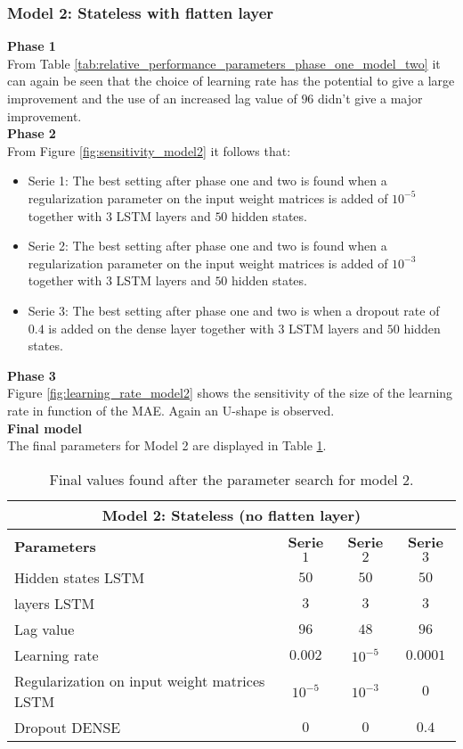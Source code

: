 \subsubsection{Model 2: Stateless with flatten layer}

\textbf{Phase 1}\\
From Table \ref{tab:relative_performance_parameters_phase_one_model_two} it can again be seen that the choice of learning rate has the potential to give a large improvement and the use of an increased lag value of $ 96 $ didn't give a major improvement.\\ 

\textbf{Phase 2}\\
From Figure \ref{fig:sensitivity_model2} it follows that:
\begin{itemize}
	\item Serie 1: The best setting after phase one and two is found when a regularization parameter on the input weight matrices is added of $ 10^{-5} $ together with $ 3 $ LSTM layers and $ 50 $ hidden states. 
	\item Serie 2: The best setting after phase one and two is found when a regularization parameter on the input weight matrices is added of $ 10^{-3} $ together with $ 3 $ LSTM layers and $ 50 $ hidden states.
	\item Serie 3: The best setting after phase one and two is when a dropout rate of $ 0.4 $ is added on the dense layer together with $ 3 $ LSTM layers and $ 50 $ hidden states.
\end{itemize}

\textbf{Phase 3}\\
Figure \ref{fig:learning_rate_model2} shows the sensitivity of the size of the learning rate in function of the MAE. Again an U-shape is observed.\\

\textbf{Final model}\\
The final parameters for Model 2 are displayed in Table \ref{tab:final_model2}.

\begin{table}[h]
	\centering
	\begin{tabular}{@{}l|ccc@{}} \toprule
		\multicolumn{4}{c}{Model 2: Stateless (no flatten layer)}\\\midrule\midrule
		\textbf{Parameters}	& \textbf{Serie $ 1 $} & \textbf{Serie $ 2 $} & \textbf{Serie $ 3 $}\\\midrule
		Hidden states LSTM & $50 $&$ 50 $  & $50 $\\
		layers LSTM & $3 $&$ 3 $  & $3$\\
		Lag value & $96 $&$ 48$  & $96$\\
		Learning rate & $0.002 $&$ 10^{-5}$  & $0.0001$\\\hline
		Regularization on input weight matrices LSTM   & $ 10^{-5} $ & $ 10^{-3} $ & $ 0 $\\
		Dropout DENSE   & $ 0 $ & $ 0 $ & $ 0.4 $\\\bottomrule
	\end{tabular}
	\caption{Final values found after the parameter search for model 2.}
	\label{tab:final_model2}
\end{table}

